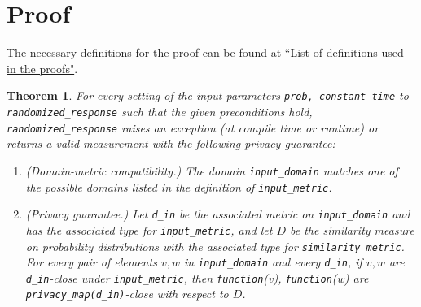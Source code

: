 \documentclass[11pt,a4paper]{article}
\newtheorem{theorem}{Theorem}[section]
\theoremstyle{definition}
\begin{document}
\section{Proof}
The necessary definitions for the proof can be found at \href{https://github.com/opendp/whitepapers/blob/proof-defns/proof-defns/proof_defns.pdf}{``List of definitions used in the proofs"}. %
\begin{theorem} For every setting of the input parameters \texttt{prob, constant\_time} to \\ \texttt{randomized\_response} such that the given preconditions hold, \texttt{randomized\_response} raises an exception (at compile time or runtime) or returns a valid measurement with the following privacy guarantee:
\begin{enumerate}  %
    \item  \textup{(Domain-metric compatibility.)} The domain \texttt{input\_domain} matches one of the possible domains listed in the definition of \texttt{input\_metric}. 
    
    \item \textup{(Privacy guarantee.)} Let \texttt{d\_in} be the associated metric on \texttt{input\_domain} and has the associated type for \texttt{input\_metric}, and let $D$ be the similarity measure on probability distributions with the associated type for \texttt{similarity\_metric}. For every pair of elements $v, w$ in \texttt{input\_domain} and every \texttt{d\_in}, if $v, w$ are \texttt{d\_in}-close under \texttt{input\_metric}, then \texttt{function}(v), \texttt{function}(w) are \texttt{privacy\_map(d\_in)}-close with respect to $D$.
\end{enumerate}
\end{theorem}
\end{document}
